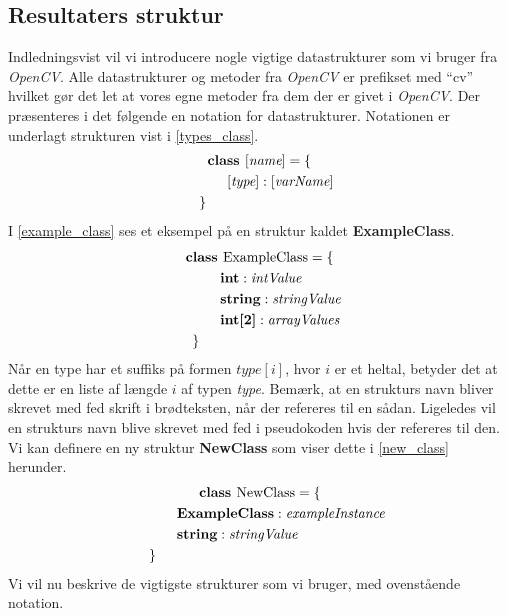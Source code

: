 {\subsection{Resultaters struktur\label{resultat_struktur}}
Indledningsvist vil vi introducere nogle vigtige datastrukturer som vi
bruger fra \emph{OpenCV}. Alle datastrukturer og metoder fra
\emph{OpenCV} er prefikset med ``cv'' hvilket gør det let at vores egne
metoder fra dem der er givet i \emph{OpenCV}.  Der præsenteres i det
følgende en notation for datastrukturer.  Notationen er underlagt
strukturen vist i \eqref{types_class}.
\begin{multline}
    \textbf{class~} [\textit{name}] = \{ \\
    \shoveleft{\qquad[\textit{type}] : [\textit{varName}]} \\
    \shoveleft{\}}\shoveright{}
    \label{types_class}
\end{multline}
I \eqref{example_class} ses et eksempel på en struktur kaldet
\textbf{ExampleClass}.
\begin{multline}
    \textbf{class~} \textrm{ExampleClass} = \{ \\
    \shoveleft{\qquad\textbf{int} : \textit{intValue}} \\
    \shoveleft{\qquad\textbf{string} : \textit{stringValue}} \\
    \shoveleft{\qquad\textbf{int[2]} : \textit{arrayValues}} \\
    \shoveleft{\}}\shoveright{}
    \label{example_class}
\end{multline}
Når en type har et suffiks på formen $\textit{type}[i]$, hvor $i$ er et
heltal, betyder det at dette er en liste af længde $i$ af typen
\textit{type}.  Bemærk, at en strukturs navn bliver skrevet med fed
skrift i brødteksten, når der refereres til en sådan. Ligeledes vil en
strukturs navn blive skrevet med fed i pseudokoden hvis der refereres
til den. Vi kan definere en ny struktur \textbf{NewClass} som viser
dette i \eqref{new_class} herunder.
\begin{multline}
    \textbf{class~} \textrm{NewClass} = \{ \\
    \shoveleft{\qquad\textbf{ExampleClass} : \textit{exampleInstance}} \\
    \shoveleft{\qquad\textbf{string} : \textit{stringValue}} \\
    \shoveleft{\}}\shoveright{}
    \label{new_class}
\end{multline}
Vi vil nu beskrive de vigtigste strukturer som vi bruger, med
ovenstående notation.

}
